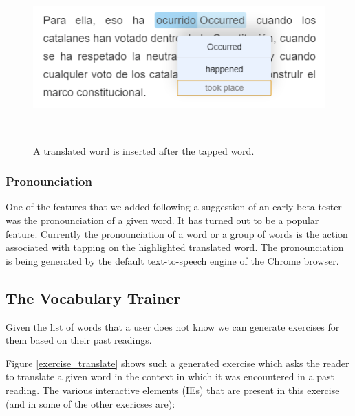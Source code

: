 \begin{figure}[h!]
\centering
  \includegraphics[width=0.8\columnwidth]{figures/translation_alter_menu}
  \caption{A translated word is inserted after the tapped word.}~\label{fig:registrations}
\end{figure}

\subsubsection{Pronounciation}
One of the features that we added following a suggestion of an early beta-tester was the pronounciation of a given word. It has turned out to be a popular feature. Currently the pronounciation of a word or a group of words is the action associated with tapping on the highlighted translated word. The pronounciation is being generated by the default text-to-speech engine of the Chrome browser. 


\subsection{The Vocabulary Trainer}

Given the list of words that a user does not know we can generate exercises for them based on their past readings.

Figure \ref{exercise_translate} shows such a generated exercise which asks the reader to translate a given word in the context in which it was encountered in a past reading. The various interactive elements (IEs) that are present in this exercise (and in some of the other exericses are): 

